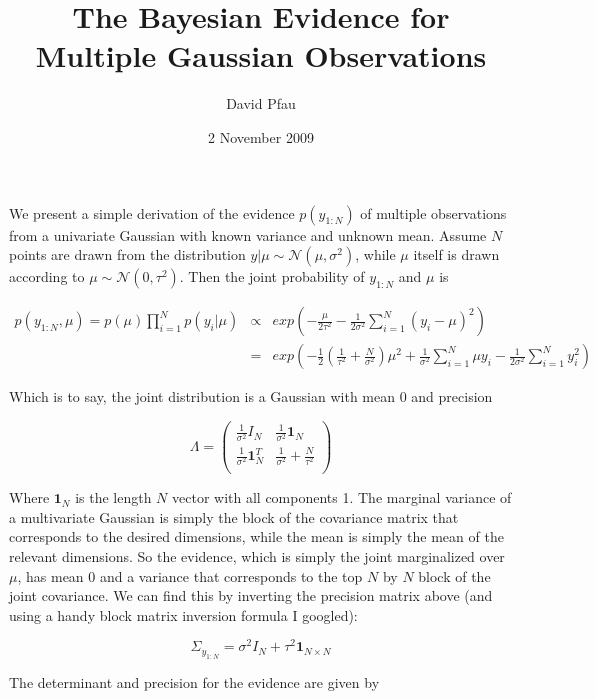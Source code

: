 \documentclass[11pt]{article}
\title{The Bayesian Evidence for Multiple Gaussian Observations}
\author{David Pfau}
\date{2 November 2009}                                           %
\begin{document}
\maketitle
We present a simple derivation of the evidence $p(y_{1:N})$ of multiple observations from a univariate Gaussian with known variance and unknown mean.  Assume $N$ points are drawn from the distribution $y|\mu \sim \mathcal{N}(\mu,\sigma^2) $, while $\mu$ itself is drawn according to $\mu \sim \mathcal{N}(0,\tau^2)$.  Then the joint probability of $y_{1:N}$ and $\mu$ is

\begin{eqnarray}
p(y_{1:N},\mu) = p(\mu)\prod_{i=1}^N p(y_i|\mu) & \propto & exp\left(-\frac{\mu}{2\tau^2} - \frac{1}{2\sigma^2} \sum_{i=1}^N (y_i - \mu)^2\right) \\
& = & exp\left( -\frac{1}{2}\left(\frac{1}{\tau^2} + \frac{N}{\sigma^2}\right)\mu^2 + \frac{1}{\sigma^2} \sum_{i=1}^N \mu y_i - \frac{1}{2\sigma^2}\sum_{i=1}^N y_i^2 \right) \nonumber
\end{eqnarray}

Which is to say, the joint distribution is a Gaussian with mean 0 and precision

\begin{equation}
\Lambda = \left( \begin{array}{cc}
\frac{1}{\sigma^2} I_N & \frac{1}{\sigma^2}\mathbf{1}_N \\
 \frac{1}{\sigma^2}\mathbf{1}_N^T & \frac{1}{\sigma^2} + \frac{N}{\tau^2} \\
\end{array} \right)
\end{equation}

Where $\mathbf{1}_N$ is the length $N$ vector with all components 1.  The marginal variance of a multivariate Gaussian is simply the block of the covariance matrix that corresponds to the desired dimensions, while the mean is simply the mean of the relevant dimensions.  So the evidence, which is simply the joint marginalized over $\mu$, has mean 0 and a variance that corresponds to the top $N$ by $N$ block of the joint covariance.  We can find this by inverting the precision matrix above (and using a handy block matrix inversion formula I googled):

\begin{equation}
\Sigma_{y_{1:N}} =  \sigma^2 I_N + \tau^2 \mathbf{1}_{N\times N}
\end{equation}

The determinant and precision for the evidence are given by
\end{document}
